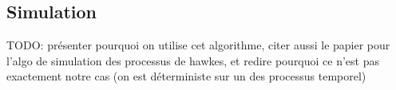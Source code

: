 \subsection{Simulation}

TODO: présenter pourquoi on utilise cet algorithme, citer aussi le papier pour l'algo de simulation des processus de hawkes, et redire pourquoi ce n'est pas exactement notre cas (on est déterministe sur un des processus temporel)

\cite{ogata1981lewis, chen2016thinning, lewis1979simulation}

